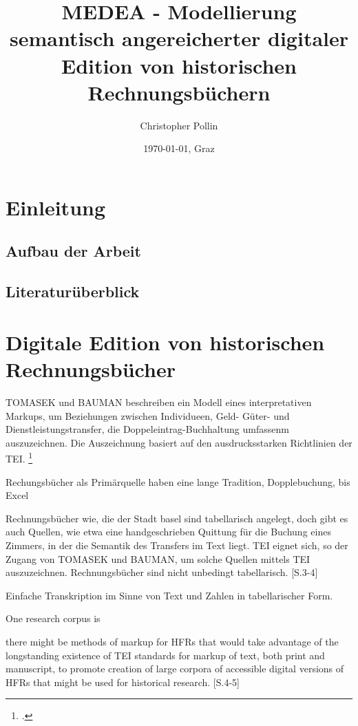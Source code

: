 \documentclass[12pt,a4paper]{article}
\author{Christopher Pollin}
\title{MEDEA - Modellierung semantisch angereicherter digitaler Edition von historischen Rechnungsbüchern}
\date{\today{}, Graz}
\begin{document}

\maketitle
\tableofcontents

\newpage
{}

\section{Einleitung}
\label{sec:Einleitung}

\subsection{Aufbau der Arbeit}
\label{subsec:Aufbau}

\subsection{Literaturüberblick}
\label{subsec:Literaturueberblick}

\section{Digitale Edition von historischen Rechnungsbücher}
\label{subsec:DigEdHiRe}

TOMASEK und BAUMAN beschreiben ein Modell eines interpretativen Markups, um Beziehungen zwischen Individueen, Geld- Güter- und Dienstleistungstransfer, die Doppeleintrag-Buchhaltung umfassenm auszuzeichnen. Die Auszeichnung basiert auf den ausdrucksstarken Richtlinien der TEI. \footcite[Vgl.][S.1-2, \protect\url{http://journals.openedition.org/jtei/895}, 08.03.2018]{tomasek2013encoding}

Rechungsbücher als Primärquelle haben eine lange Tradition, Dopplebuchung, bis Excel

Rechnungsbücher wie, die der Stadt basel sind tabellarisch angelegt, doch gibt es auch Quellen, wie etwa eine handgeschrieben Quittung für die Buchung eines Zimmers, in der die Semantik des Transfers im Text liegt. TEI eignet sich, so der Zugang von TOMASEK und BAUMAN, um solche Quellen mittels TEI auszuzeichnen.
Rechnungsbücher sind nicht unbedingt tabellarisch. [S.3-4]

Einfache Transkription im Sinne von Text und Zahlen in tabellarischer Form.


One research corpus is 

there might be methods of markup for HFRs that would take advantage of the longstanding existence of TEI standards for markup of text, both print and manuscript, to promote creation of large corpora of accessible digital versions of HFRs that might be used for historical research. [S.4-5]
\end{document}

